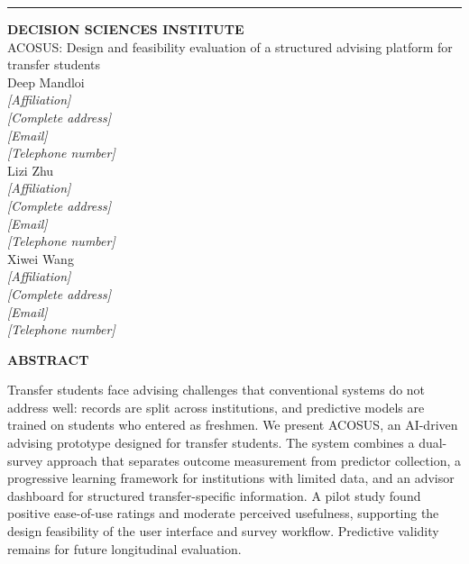 \documentclass[letterpaper,11pt]{article}
\begin{document}
\thispagestyle{empty}
\noindent{}\par
\vspace{2pt}
\hrule
\vspace{24pt}

\begin{center}
\textbf{DECISION SCIENCES INSTITUTE}\\[6pt]
ACOSUS: Design and feasibility evaluation of a structured advising platform for transfer students
\\[12pt]
Deep Mandloi\\
\textit{[Affiliation]}\\
\textit{[Complete address]}\\
\textit{[Email]}\\
\textit{[Telephone number]}\\[6pt]
Lizi Zhu\\
\textit{[Affiliation]}\\
\textit{[Complete address]}\\
\textit{[Email]}\\
\textit{[Telephone number]}\\[6pt]
Xiwei Wang\\
\textit{[Affiliation]}\\
\textit{[Complete address]}\\
\textit{[Email]}\\
\textit{[Telephone number]}
\end{center}

\bigskip
\begin{center}
\textbf{ABSTRACT}
\end{center}

Transfer students face advising challenges that conventional systems do not address well: records are split across institutions, and predictive models are trained on students who entered as freshmen. We present ACOSUS, an AI-driven advising prototype designed for transfer students. The system combines a dual-survey approach that separates outcome measurement from predictor collection, a progressive learning framework for institutions with limited data, and an advisor dashboard for structured transfer-specific information. A pilot study found positive ease-of-use ratings and moderate perceived usefulness, supporting the design feasibility of the user interface and survey workflow. Predictive validity remains for future longitudinal evaluation.
\end{document}
